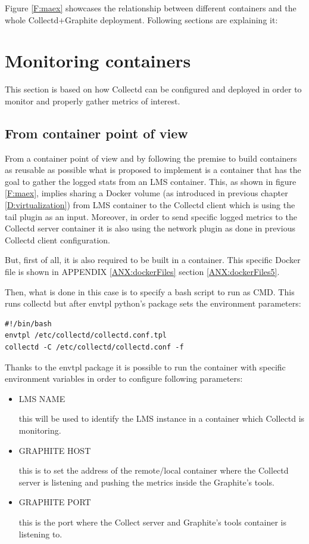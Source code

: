 Figure \ref{F:maex} showcases the relationship between different containers and the whole Collectd+Graphite deployment. Following sections are explaining it:

\section{Monitoring containers}

This section is based on how Collectd can be configured and deployed in order to monitor and properly gather metrics of interest.

\subsection{From container point of view}

From a container point of view and by following the premise to build containers as reusable as possible what is proposed to implement is a container that has the goal to gather the logged stats from an LMS container. This, as shown in figure \ref{F:maex}, implies sharing a Docker volume (as introduced in previous chapter \ref{D:virtualization}) from LMS container to the Collectd client which is using the tail plugin as an input. Moreover, in order to send specific logged metrics to the Collectd server container it is also using the network plugin as done in previous Collectd client configuration.

But, first of all, it is also required to be built in a container. This specific Docker file is shown in APPENDIX \ref{ANX:dockerFiles} section \ref{ANX:dockerFiles5}.

Then, what is done in this case is to specify a bash script to run as CMD. This runs collectd but after envtpl python's package sets the environment parameters:
\begin{verbatim}
#!/bin/bash
envtpl /etc/collectd/collectd.conf.tpl
collectd -C /etc/collectd/collectd.conf -f
\end{verbatim}

Thanks to the envtpl package it is possible to run the container with specific environment variables in order to configure following parameters:

\begin{itemize}
\item LMS NAME \hfill

this will be used to identify the LMS instance in a container which Collectd is monitoring.
\item GRAPHITE HOST \hfill

this is to set the address of the remote/local container where the Collectd server is listening and pushing the metrics inside the Graphite's tools.
\item GRAPHITE PORT \hfill

this is the port where the Collect server and Graphite's tools container is listening to.
\end{itemize}

